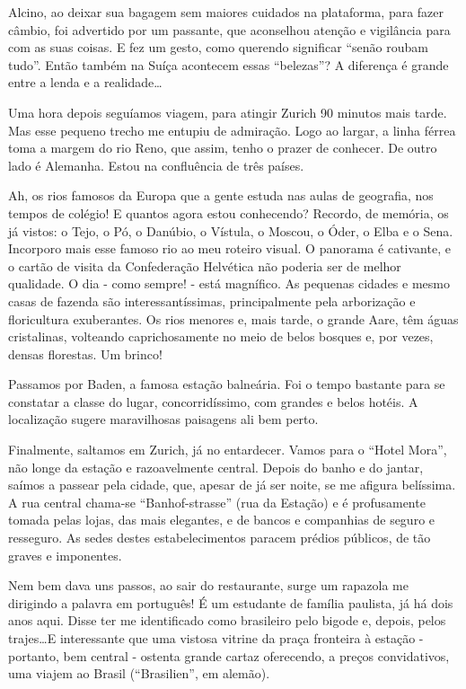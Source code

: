Alcino, ao deixar sua bagagem sem maiores cuidados na plataforma, para fazer câmbio, foi advertido por um passante, que aconselhou atenção e vigilância para com as suas coisas. E fez um gesto, como querendo significar ``senão roubam tudo''. Então também na Suíça acontecem essas ``belezas''? A diferença é grande entre a lenda e a realidade\ldots

Uma hora depois seguíamos viagem, para atingir Zurich 90 minutos mais tarde. Mas esse pequeno trecho me entupiu de admiração. Logo ao largar, a linha férrea toma a margem do rio Reno, que assim, tenho o prazer de conhecer. De outro lado é Alemanha. Estou na confluência de três países.

Ah, os rios famosos da Europa que a gente estuda nas aulas de geografia, nos tempos de colégio! E quantos agora estou conhecendo? Recordo, de memória, os já vistos: o Tejo, o Pó, o Danúbio, o Vístula, o Moscou, o Óder, o Elba e o Sena. Incorporo mais esse famoso rio ao meu roteiro visual. O panorama é cativante, e o cartão de visita da Confederação Helvética não poderia ser de melhor qualidade. O dia - como sempre! - está magnífico. As pequenas cidades e mesmo casas de fazenda são interessantíssimas, principalmente pela arborização e floricultura exuberantes. Os rios menores e, mais tarde, o grande Aare, têm águas cristalinas, volteando caprichosamente no meio de belos bosques e, por vezes, densas florestas. Um brinco!

Passamos por Baden, a famosa estação balneária. Foi o tempo bastante para se constatar a classe do lugar, concorridíssimo, com grandes e belos hotéis. A localização sugere maravilhosas paisagens ali bem perto.

Finalmente, saltamos em Zurich, já no entardecer. Vamos para o ``Hotel Mora'', não longe da estação e razoavelmente central. Depois do banho e do jantar, saímos a passear pela cidade, que, apesar de já ser noite, se me afigura belíssima. A rua central chama-se ``Banhof-strasse'' (rua da Estação) e é profusamente tomada pelas lojas, das mais elegantes, e de bancos e companhias de seguro e resseguro. As sedes destes estabelecimentos paracem prédios públicos, de tão graves e imponentes.

Nem bem dava uns passos, ao sair do restaurante, surge um rapazola me dirigindo a palavra em português! É um estudante de família paulista, já há dois anos aqui. Disse ter me identificado como brasileiro pelo bigode e, depois, pelos trajes\ldots E interessante que uma vistosa vitrine da praça fronteira à estação - portanto, bem central - ostenta grande cartaz oferecendo, a preços convidativos, uma viajem ao Brasil (``Brasilien'', em alemão).

